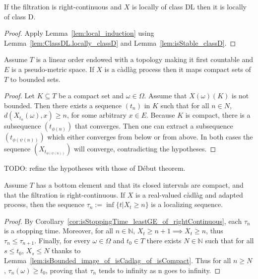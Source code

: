 \begin{lemma}\label{lem:locally_classD_of_locally_classDL}
  \leanok
If the filtration is right-continuous and $X$ is locally of class DL then it is locally of class D.
\end{lemma}

\begin{proof}
  \leanok
Apply Lemma~\ref{lem:local_induction} using Lemma~\ref{lem:ClassDL.locally_classD} and Lemma~\ref{lem:isStable_classD}.
\end{proof}


\begin{lemma}\label{lem:isBounded_image_of_isCadlag_of_isCompact}
  \mathlibok
Assume $T$ is a linear order endowed with a topology making it first countable and $E$ is a pseudo-metric space. If $X$ is a càdlàg process then it maps compact sets of $T$ to bounded sets.
\end{lemma}

\begin{proof}\mathlibok
Let $K \subseteq T$ be a compact set and $\omega \in \Omega$. Assume that $X(\omega)(K)$ is not bounded. Then there exists a sequence $(t_n)$ in $K$ such that for all $n \in N$, $d(X_{t_n}(\omega), x) \ge n$, for some arbitrary $x \in E$. Because $K$ is compact, there is a subsequence $(t_{\phi(n)})$ that converges. Then one can extract a subsequence $(t_{\phi(\psi(n))})$ which either converges from below or from above. In both cases the sequence $(X_{t_{\phi(\psi(n))}})$ will converge, contradicting the hypotheses.
\end{proof}


TODO: refine the hypotheses with those of Début theorem.
\begin{lemma}\label{lem:isLocalizingSequence_leastGE}
  \leanok
Assume $T$ has a bottom element and that its closed intervals are compact, and that the filtration is right-continuous.
If $X$ is a real-valued càdlàg and adapted process, then the sequence $\tau_n := \inf \{t | X_t \ge n\}$ is a localizing sequence.
\end{lemma}

\begin{proof}
By Corollary~\ref{cor:isStoppingTime_leastGE_of_rightContinuous}, each $\tau_n$ is a stopping time. Moreover, for all $n \in \mathbb{N}$, $X_t \ge n+1 \implies X_t \ge n$, thus $\tau_n \le \tau_{n+1}$. Finally, for every $\omega \in \Omega$ and $t_0 \in T$ there exists $N \in \mathbb{N}$ such that for all $s \le t_0$, $X_s \le N$ thanks to Lemma~\ref{lem:isBounded_image_of_isCadlag_of_isCompact}. Thus for all $n \ge N$, $\tau_n(\omega) \ge t_0$, proving that $\tau_n$ tends to infinity as n goes to infinity.
\end{proof}


